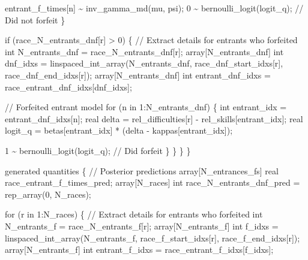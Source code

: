 \documentclass[
  letterpaper,
  DIV=11,
  numbers=noendperiod]{scrartcl}
\newenvironment{Shaded}{\begin{snugshade}}{\end{snugshade}}
\newcommand{\CommentTok}[1]{\textcolor[rgb]{0.37,0.37,0.37}{#1}}
\newcommand{\ControlFlowTok}[1]{\textcolor[rgb]{0.00,0.23,0.31}{#1}}
\newcommand{\DataTypeTok}[1]{\textcolor[rgb]{0.68,0.00,0.00}{#1}}
\newcommand{\DecValTok}[1]{\textcolor[rgb]{0.68,0.00,0.00}{#1}}
\newcommand{\KeywordTok}[1]{\textcolor[rgb]{0.00,0.23,0.31}{#1}}
\newcommand{\NormalTok}[1]{\textcolor[rgb]{0.00,0.23,0.31}{#1}}
\begin{document}
\begin{codelisting}
\begin{Shaded}
\begin{Highlighting}[]
\NormalTok{      entrant\_f\_times[n] \textasciitilde{} inv\_gamma\_md(mu, psi);}
      \DecValTok{0}\NormalTok{ \textasciitilde{} bernoulli\_logit(logit\_q); }\CommentTok{// Did not forfeit}
\NormalTok{    \}}

    \ControlFlowTok{if}\NormalTok{ (race\_N\_entrants\_dnf[r] \textgreater{} }\DecValTok{0}\NormalTok{) \{}
      \CommentTok{// Extract details for entrants who forfeited}
      \DataTypeTok{int}\NormalTok{ N\_entrants\_dnf = race\_N\_entrants\_dnf[r];}
      \DataTypeTok{array}\NormalTok{[N\_entrants\_dnf]}
        \DataTypeTok{int}\NormalTok{ dnf\_idxs = linspaced\_int\_array(N\_entrants\_dnf,}
\NormalTok{                                           race\_dnf\_start\_idxs[r],}
\NormalTok{                                           race\_dnf\_end\_idxs[r]);}
      \DataTypeTok{array}\NormalTok{[N\_entrants\_dnf]}
        \DataTypeTok{int}\NormalTok{ entrant\_dnf\_idxs = race\_entrant\_dnf\_idxs[dnf\_idxs];}

      \CommentTok{// Forfeited entrant model}
      \ControlFlowTok{for}\NormalTok{ (n }\ControlFlowTok{in} \DecValTok{1}\NormalTok{:N\_entrants\_dnf) \{}
        \DataTypeTok{int}\NormalTok{ entrant\_idx = entrant\_dnf\_idxs[n];}
        \DataTypeTok{real}\NormalTok{ delta = rel\_difficulties[r] {-} rel\_skills[entrant\_idx];}
        \DataTypeTok{real}\NormalTok{ logit\_q = betas[entrant\_idx] * (delta {-} kappas[entrant\_idx]);}

        \DecValTok{1}\NormalTok{ \textasciitilde{} bernoulli\_logit(logit\_q); }\CommentTok{// Did forfeit}
\NormalTok{      \}}
\NormalTok{    \}}
\NormalTok{  \}}
\NormalTok{\}}

\KeywordTok{generated quantities}\NormalTok{ \{}
  \CommentTok{// Posterior predictions}
  \DataTypeTok{array}\NormalTok{[N\_entrances\_fs] }\DataTypeTok{real}\NormalTok{ race\_entrant\_f\_times\_pred;}
  \DataTypeTok{array}\NormalTok{[N\_races] }\DataTypeTok{int}\NormalTok{ race\_N\_entrants\_dnf\_pred = rep\_array(}\DecValTok{0}\NormalTok{, N\_races);}

  \ControlFlowTok{for}\NormalTok{ (r }\ControlFlowTok{in} \DecValTok{1}\NormalTok{:N\_races) \{}
    \CommentTok{// Extract details for entrants who forfeited}
    \DataTypeTok{int}\NormalTok{ N\_entrants\_f = race\_N\_entrants\_f[r];}
    \DataTypeTok{array}\NormalTok{[N\_entrants\_f] }\DataTypeTok{int}\NormalTok{ f\_idxs}
\NormalTok{      = linspaced\_int\_array(N\_entrants\_f,}
\NormalTok{                            race\_f\_start\_idxs[r],}
\NormalTok{                            race\_f\_end\_idxs[r]);}
    \DataTypeTok{array}\NormalTok{[N\_entrants\_f] }\DataTypeTok{int}\NormalTok{ entrant\_f\_idxs}
\NormalTok{      = race\_entrant\_f\_idxs[f\_idxs];}


\end{Highlighting}
\end{Shaded}
\end{codelisting}
\end{document}
